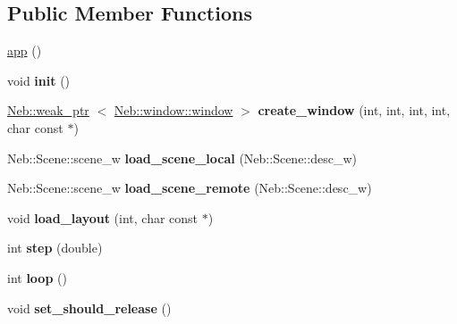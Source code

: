 \subsection*{\-Public \-Member \-Functions}
\begin{DoxyCompactItemize}
\item 
\hyperlink{classNeb_1_1app_a729bf4c1785929d7449d614619f74191}{app} ()
\item 
\hypertarget{classNeb_1_1app_a32164de189f14d814cfaca3e898b3a7f}{void {\bfseries init} ()}\label{classNeb_1_1app_a32164de189f14d814cfaca3e898b3a7f}

\item 
\hypertarget{classNeb_1_1app_a102dfddbecdd44cb9d310a8941a707ef}{\hyperlink{classNeb_1_1weak__ptr}{\-Neb\-::weak\-\_\-ptr}\*
$<$ \hyperlink{classNeb_1_1window_1_1window}{\-Neb\-::window\-::window} $>$ {\bfseries create\-\_\-window} (int, int, int, int, char const $\ast$)}\label{classNeb_1_1app_a102dfddbecdd44cb9d310a8941a707ef}

\item 
\hypertarget{classNeb_1_1app_a099e5961b00946a31c2b6d4da029f352}{\-Neb\-::\-Scene\-::scene\-\_\-w {\bfseries load\-\_\-scene\-\_\-local} (\-Neb\-::\-Scene\-::desc\-\_\-w)}\label{classNeb_1_1app_a099e5961b00946a31c2b6d4da029f352}

\item 
\hypertarget{classNeb_1_1app_a535605a9b6365aca41ca5655ae73a61c}{\-Neb\-::\-Scene\-::scene\-\_\-w {\bfseries load\-\_\-scene\-\_\-remote} (\-Neb\-::\-Scene\-::desc\-\_\-w)}\label{classNeb_1_1app_a535605a9b6365aca41ca5655ae73a61c}

\item 
\hypertarget{classNeb_1_1app_ad0e771e82f86ee786e1b342c18975fd2}{void {\bfseries load\-\_\-layout} (int, char const $\ast$)}\label{classNeb_1_1app_ad0e771e82f86ee786e1b342c18975fd2}

\item 
\hypertarget{classNeb_1_1app_ae364bf8705edcd0b65375d6831df326f}{int {\bfseries step} (double)}\label{classNeb_1_1app_ae364bf8705edcd0b65375d6831df326f}

\item 
\hypertarget{classNeb_1_1app_a3d1e3aa10f78a8e737352a90c1ff2004}{int {\bfseries loop} ()}\label{classNeb_1_1app_a3d1e3aa10f78a8e737352a90c1ff2004}

\item 
\hypertarget{classNeb_1_1app_a585d3455638323086057befeb4e91a1b}{void {\bfseries set\-\_\-should\-\_\-release} ()}\label{classNeb_1_1app_a585d3455638323086057befeb4e91a1b}


\end{DoxyCompactItemize}

